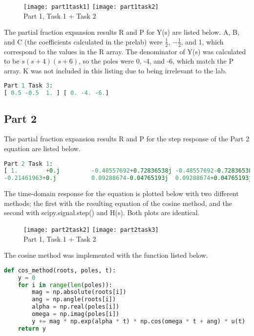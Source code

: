 \documentclass[11pt,a4,titlepage]{article}
\begin{document}
\begin{figure}[H]
\centering
\texttt{[image: part1task1]}
\texttt{[image: part1task2]}
\\ Part 1, Task 1 + Task 2
\end{figure}

The partial fraction expansion results R and P for Y(s) are listed below. A, B, and C (the coefficients calculated in the prelab) were $\frac{1}{2}$, $-\frac{1}{2}$, and 1, which correspond to the values in the R array. The denominator of Y(s) was calculated to be $s(s+4)(s+6)$, so the poles were 0, -4, and -6, which match the P array. K was not included in this listing due to being irrelevant to the lab.
\begin{lstlisting}[language=Python]
Part 1 Task 3:
[ 0.5 -0.5  1. ] [ 0. -4. -6.]
\end{lstlisting}

\subsection{Part 2}
The partial fraction expansion results R and P for the step response of the Part 2 equation are listed below.
\begin{lstlisting}[language=Python]
Part 2 Task 1:
[ 1.        +0.j         -0.48557692+0.72836538j -0.48557692-0.72836538j
-0.21461963+0.j          0.09288674-0.04765193j  0.09288674+0.04765193j] [  0. +0.j  -3. +4.j  -3. -4.j -10. +0.j  -1.+10.j  -1.-10.j]
\end{lstlisting}

The time-domain response for the equation is plotted below with two different methods; the first with the resulting equation of the cosine method, and the second with scipy.signal.step() and H(s). Both plots are identical.

\begin{figure}[H]
\centering
\texttt{[image: part2task2]}
\texttt{[image: part2task3]}
\\ Part 1, Task 1 + Task 2
\end{figure}

The cosine method was implemented with the function listed below.

\begin{lstlisting}[language=Python]
def cos_method(roots, poles, t):
	y = 0
	for i in range(len(poles)):
		mag = np.absolute(roots[i])
		ang = np.angle(roots[i])
		alpha = np.real(poles[i])
		omega = np.imag(poles[i])
		y += mag * np.exp(alpha * t) * np.cos(omega * t + ang) * u(t)
	return y
\end{lstlisting}
\end{document}
